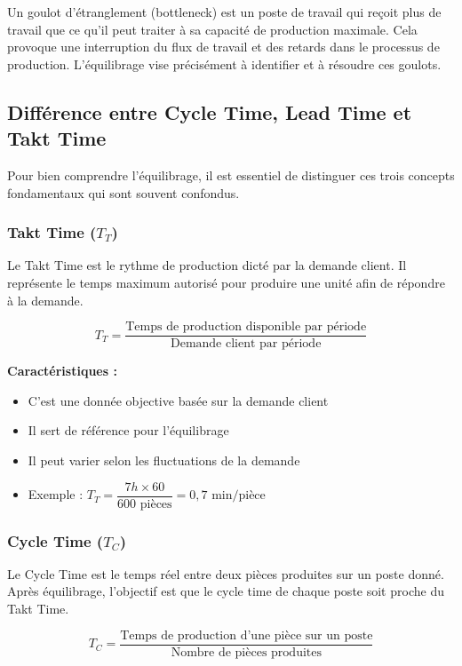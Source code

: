 \documentclass[12pt,a4paper]{article}
\begin{document}
Un goulot d'étranglement (bottleneck) est un poste de travail qui reçoit plus de travail que ce qu'il peut traiter à sa capacité de production maximale. Cela provoque une interruption du flux de travail et des retards dans le processus de production. L'équilibrage vise précisément à identifier et à résoudre ces goulots.

\subsection{Différence entre Cycle Time, Lead Time et Takt Time}

Pour bien comprendre l'équilibrage, il est essentiel de distinguer ces trois concepts fondamentaux qui sont souvent confondus.

\subsubsection{Takt Time ($T_T$)}

Le Takt Time est le rythme de production dicté par la demande client. Il représente le temps maximum autorisé pour produire une unité afin de répondre à la demande.

\[
\boxed{T_T = \frac{\text{Temps de production disponible par période}}{\text{Demande client par période}}}
\]

\textbf{Caractéristiques :}
\begin{itemize}
    \item C'est une donnée objective basée sur la demande client
    \item Il sert de référence pour l'équilibrage
    \item Il peut varier selon les fluctuations de la demande
    \item Exemple : $T_T = \dfrac{7h \times 60}{600 \text{ pièces}} = 0,7 \text{ min/pièce}$
\end{itemize}

\subsubsection{Cycle Time ($T_C$)}

Le Cycle Time est le temps réel entre deux pièces produites sur un poste donné. Après équilibrage, l'objectif est que le cycle time de chaque poste soit proche du Takt Time.

\[
\boxed{T_C = \frac{\text{Temps de production d'une pièce sur un poste}}{\text{Nombre de pièces produites}}}
\]
\end{document}
